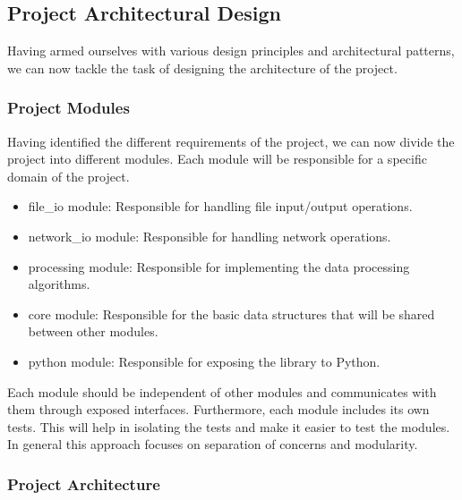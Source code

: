 \begin{spacing}{1.2}

    \subsection{Project Architectural Design}
    Having armed ourselves with various design principles and architectural patterns, we can now
    tackle the task of designing the architecture of the project.
    \subsubsection{Project Modules}
    Having identified the different requirements of the project, we can now divide the project into
    different modules. Each module will be responsible for a specific domain of the project.

    \begin{itemize}
        \item file\_io module: Responsible for handling file input/output operations.
        \item network\_io module: Responsible for handling network operations.
        \item processing module: Responsible for implementing the data processing algorithms.
        \item core module: Responsible for the basic data structures that will be shared between other modules.
        \item python module: Responsible for exposing the library to Python.
    \end{itemize}

    Each module should be independent of other modules and communicates with them through exposed interfaces.
    Furthermore, each module includes its own tests. This will help in isolating the tests
    and make it easier to test the modules. In general this approach focuses on separation of
    concerns and modularity.\\

    \subsubsection{Project Architecture}


\end{spacing}
